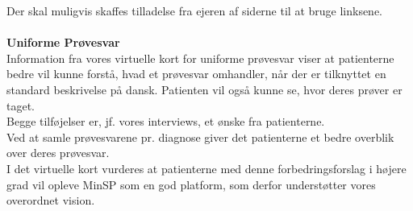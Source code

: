 Der skal muligvis skaffes tilladelse fra ejeren af siderne til at bruge linksene.
\\\\
\textbf{Uniforme Prøvesvar}\\
Information fra vores virtuelle kort for uniforme prøvesvar viser at patienterne bedre vil kunne forstå, hvad et prøvesvar omhandler, når der er tilknyttet en standard beskrivelse på dansk. Patienten vil også kunne se, hvor deres prøver er taget.\\
Begge tilføjelser er, jf. vores interviews, et ønske fra patienterne.\\
Ved at samle prøvesvarene pr. diagnose giver det patienterne et bedre overblik over deres prøvesvar.\\
I det virtuelle kort vurderes at patienterne med denne forbedringsforslag i højere grad vil opleve MinSP som en god platform, som derfor understøtter vores overordnet vision. 
